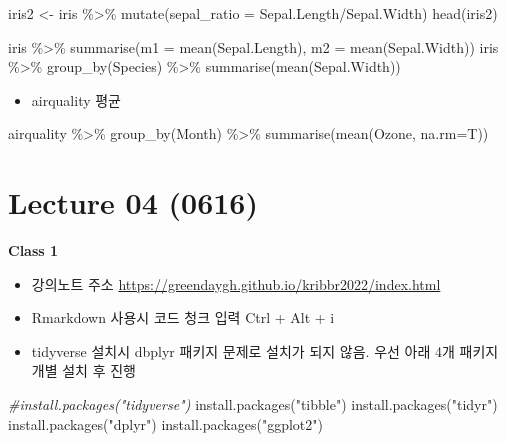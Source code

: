 \documentclass[
]{book}
\newenvironment{Shaded}{\begin{snugshade}}{\end{snugshade}}
\newcommand{\AttributeTok}[1]{\textcolor[rgb]{0.77,0.63,0.00}{#1}}
\newcommand{\CommentTok}[1]{\textcolor[rgb]{0.56,0.35,0.01}{\textit{#1}}}
\newcommand{\FunctionTok}[1]{\textcolor[rgb]{0.00,0.00,0.00}{#1}}
\newcommand{\NormalTok}[1]{#1}
\newcommand{\OtherTok}[1]{\textcolor[rgb]{0.56,0.35,0.01}{#1}}
\newcommand{\SpecialCharTok}[1]{\textcolor[rgb]{0.00,0.00,0.00}{#1}}
\newcommand{\StringTok}[1]{\textcolor[rgb]{0.31,0.60,0.02}{#1}}
\providecommand{\tightlist}{%
  \setlength{\itemsep}{0pt}\setlength{\parskip}{0pt}}
\begin{document}
\begin{Shaded}
\begin{Highlighting}[]
\NormalTok{iris2 }\OtherTok{\textless{}{-}}\NormalTok{ iris }\SpecialCharTok{\%\textgreater{}\%} \FunctionTok{mutate}\NormalTok{(}\AttributeTok{sepal\_ratio =}\NormalTok{ Sepal.Length}\SpecialCharTok{/}\NormalTok{Sepal.Width)}
\FunctionTok{head}\NormalTok{(iris2)}



\NormalTok{iris }\SpecialCharTok{\%\textgreater{}\%} \FunctionTok{summarise}\NormalTok{(}\AttributeTok{m1 =} \FunctionTok{mean}\NormalTok{(Sepal.Length), }\AttributeTok{m2 =} \FunctionTok{mean}\NormalTok{(Sepal.Width))}
\NormalTok{iris }\SpecialCharTok{\%\textgreater{}\%} 
  \FunctionTok{group\_by}\NormalTok{(Species) }\SpecialCharTok{\%\textgreater{}\%} 
  \FunctionTok{summarise}\NormalTok{(}\FunctionTok{mean}\NormalTok{(Sepal.Width))}
\end{Highlighting}
\end{Shaded}

\begin{itemize}
\tightlist
\item
  airquality 평균
\end{itemize}

\begin{Shaded}
\begin{Highlighting}[]

\NormalTok{airquality }\SpecialCharTok{\%\textgreater{}\%} 
  \FunctionTok{group\_by}\NormalTok{(Month) }\SpecialCharTok{\%\textgreater{}\%} 
  \FunctionTok{summarise}\NormalTok{(}\FunctionTok{mean}\NormalTok{(Ozone, }\AttributeTok{na.rm=}\NormalTok{T))}
\end{Highlighting}
\end{Shaded}

\hypertarget{lecture-04-0616}{%
\section{Lecture 04 (0616)}\label{lecture-04-0616}}

\textbf{Class 1}

\begin{itemize}
\tightlist
\item
  강의노트 주소 \url{https://greendaygh.github.io/kribbr2022/index.html}
\item
  Rmarkdown 사용시 코드 청크 입력 Ctrl + Alt + i
\item
  tidyverse 설치시 dbplyr 패키지 문제로 설치가 되지 않음. 우선 아래 4개 패키지 개별 설치 후 진행
\end{itemize}

\begin{Shaded}
\begin{Highlighting}[]

\CommentTok{\#install.packages("tidyverse")}
\FunctionTok{install.packages}\NormalTok{(}\StringTok{"tibble"}\NormalTok{)}
\FunctionTok{install.packages}\NormalTok{(}\StringTok{"tidyr"}\NormalTok{)}
\FunctionTok{install.packages}\NormalTok{(}\StringTok{"dplyr"}\NormalTok{)}
\FunctionTok{install.packages}\NormalTok{(}\StringTok{"ggplot2"}\NormalTok{)}
\end{Highlighting}
\end{Shaded}
\end{document}
